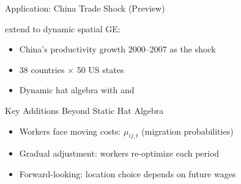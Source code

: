 \documentclass{beamer}
\begin{document}
\begin{frame}{Application: China Trade Shock (Preview)}

    \cite{CaliendoDvorkinParro2019_trade_labor} extend to dynamic spatial GE:

    \vspace{0.3em}
    \begin{itemize}
        \item China's productivity growth 2000--2007 as the shock
        \item 38 countries $\times$ 50 US states
        \item Dynamic hat algebra with  and 
    \end{itemize}

    \vspace{0.3em}
    \begin{block}{Key Additions Beyond Static Hat Algebra}
        \begin{itemize}
            \item Workers face moving costs: $\mu_{ij,t}$ (migration probabilities)
            \item Gradual adjustment: workers re-optimize each period
            \item Forward-looking: location choice depends on future wages
        \end{itemize}
    \end{block}

    \vspace{0.2em}

\end{frame}
\end{document}
